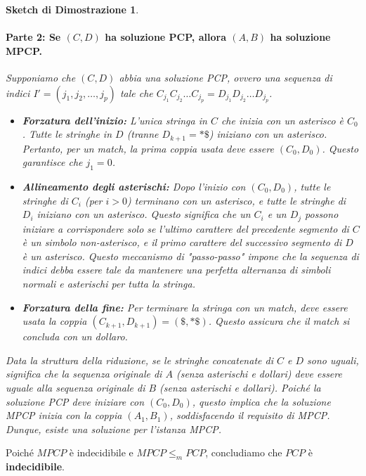 \documentclass[a4paper, 11pt]{book} %
\newtheorem{proof_sketch}[theorem]{Sketch di Dimostrazione}
\theoremstyle{definition}
\begin{document}
\begin{proof_sketch}
\paragraph{Parte 2: Se $(C, D)$ ha soluzione PCP, allora $(A, B)$ ha soluzione MPCP.}
Supponiamo che $(C, D)$ abbia una soluzione PCP, ovvero una sequenza di indici $I' = (j_1, j_2, \dots, j_p)$ tale che $C_{j_1} C_{j_2} \dots C_{j_p} = D_{j_1} D_{j_2} \dots D_{j_p}$.
\begin{itemize}
    \item \textbf{Forzatura dell'inizio:} L'unica stringa in $C$ che inizia con un asterisco è $C_0$. Tutte le stringhe in $D$ (tranne $D_{k+1}=*\$$) iniziano con un asterisco. Pertanto, per un match, la prima coppia usata deve essere $(C_0, D_0)$. Questo garantisce che $j_1 = 0$.
    \item \textbf{Allineamento degli asterischi:} Dopo l'inizio con $(C_0, D_0)$, tutte le stringhe di $C_i$ (per $i>0$) terminano con un asterisco, e tutte le stringhe di $D_i$ iniziano con un asterisco. Questo significa che un $C_i$ e un $D_j$ possono iniziare a corrispondere solo se l'ultimo carattere del precedente segmento di $C$ è un simbolo non-asterisco, e il primo carattere del successivo segmento di $D$ è un asterisco. Questo meccanismo di "passo-passo" impone che la sequenza di indici debba essere tale da mantenere una perfetta alternanza di simboli normali e asterischi per tutta la stringa.
    \item \textbf{Forzatura della fine:} Per terminare la stringa con un match, deve essere usata la coppia $(C_{k+1}, D_{k+1}) = (\$, *\$)$. Questo assicura che il match si concluda con un dollaro.
\end{itemize}
Data la struttura della riduzione, se le stringhe concatenate di $C$ e $D$ sono uguali, significa che la sequenza originale di $A$ (senza asterischi e dollari) deve essere uguale alla sequenza originale di $B$ (senza asterischi e dollari).
Poiché la soluzione PCP deve iniziare con $(C_0, D_0)$, questo implica che la soluzione MPCP inizia con la coppia $(A_1, B_1)$, soddisfacendo il requisito di MPCP.
Dunque, esiste una soluzione per l'istanza MPCP.
\end{proof_sketch}

Poiché $MPCP$ è indecidibile e $MPCP \le_m PCP$, concludiamo che $PCP$ è \textbf{indecidibile}.


\end{document}

